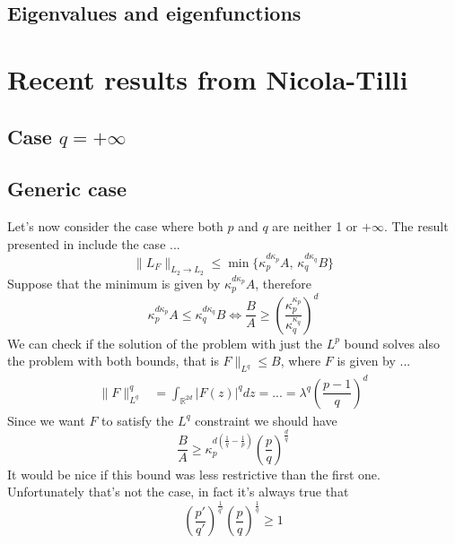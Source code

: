 \documentclass[corpo=11pt, stile=classica, tipotesi=custom,
greek, evenboxes, english]{toptesi}
\numberwithin{equation}{chapter}
\newcommand{\R}{\mathbb{R}} %
\begin{document}
\section{Eigenvalues and eigenfunctions}

\chapter{Recent results from Nicola-Tilli}
\section{Case $q=+\infty$}
\section{Generic case}
Let's now consider the case where both $p$ and $q$ are neither 1 or $+\infty$. The result presented in \cite{nicolatilli_norm} include the case ...
\begin{equation*}
	\| L_F\|_{L_2 \rightarrow L_2} \leq \min\{\kappa_p^{d\kappa_p}A, \, \kappa_q^{d\kappa_q}B\}
\end{equation*}
Suppose that the minimum is given by $\kappa_p^{d\kappa_p}A$, therefore
\begin{equation*}
	\kappa_p^{d\kappa_p}A \leq \kappa_q^{d\kappa_q}B \iff \dfrac{B}{A} \geq \left(\dfrac{\kappa_p^{\kappa_p}}{\kappa_q^{\kappa_q}}\right)^d
\end{equation*}
We can check if the solution of the problem with just the $L^p$ bound solves also the problem with both bounds, that is $F\|_{L^q} \leq B$, where $F$ is given by ...
\begin{align*}
	\| F \|_{L^q}^q &= \int_{\R^{2d}} |F(z)|^q dz = ... = \lambda^q \left(\dfrac{p-1}{q}\right)^d
\end{align*}
Since we want $F$ to satisfy the $L^q$ constraint we should have
\begin{equation*}
	\dfrac{B}{A} \geq \kappa_p^{d\left(\frac1q - \frac1p\right)}\left(\dfrac{p}{q}\right)^{\frac{d}{q}}
\end{equation*}
It would be nice if this bound was less restrictive than the first one. Unfortunately that's not the case, in fact it's always true that
\begin{equation*}
	\left(\dfrac{p'}{q'}\right)^{\frac1{q'}} \left(\dfrac{p}{q}\right)^{\frac1q} \geq 1
\end{equation*}
\end{document}
